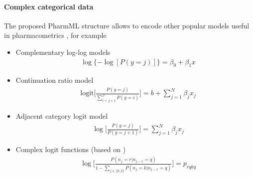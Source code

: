 \paragraph{Complex categorical data} The proposed PharmML structure allows to encode 
other popular models useful in pharmacometrics \cite{Dobson:2002uq}, for example
\begin{itemize}
\item
Complementary log-log models
\begin{align}
& \log\{-\log[P(y=j)]\} = \beta_0 + \beta_1 x \nonumber
\end{align}
\item
Continuation ratio model
\begin{align}
& \text{logit}\Big[\frac{P(y=j) }{ \sum_{i =j+1}^{J} P(y=i) } \Big] = b + \sum_{j = 1}^{N} \beta_j x_j \nonumber
\end{align}
\item
Adjacent category logit model
\begin{align}
& \log\Big[\frac{P(y=j) }{ P(y=j+1) } \Big] = \sum_{j = 1}^{N} \beta_j x_j \nonumber
\end{align}
\item
Complex logit functions (based on \cite{Girard:1998fk})
\begin{align}
& \log \Big[\frac{P(n_j=r | n_{j-1}=q) }{ 1 - \sum_{j\in \{0,2\}} P(n_j=k | n_{j-1} = q)} \Big] = p_{rqkq} \nonumber
\end{align}
\end{itemize}


%
%


